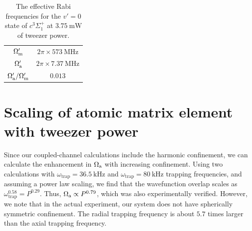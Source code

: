 \documentclass[aps,secnumarabic,amsmath,amssymb,10pt,superscriptaddress]{revtex4}
\newcommand{\todo}[1]{}
\begin{document}

\begin{table}[ht]
  \centering
  \begin{tabular}{|c|c|} \hline
    $\Omega_{\rm m}'$ &  $2\pi \times 573 ~\mathrm{MHz}$ \\
    $\Omega_{\rm a}'$ &  $2\pi \times 7.37 ~\mathrm{MHz}$ \\
    $\Omega_{\rm a}'/\Omega_{\rm m}'$ & $ 0.013 $ \\ \hline
  \end{tabular}
  \caption{ The effective Rabi frequencies for the $v' = 0$ state of $c^3\Sigma^+_1$ at $ 3.75~\mathrm{mW}$ of tweezer power.
    \label{tab:sm}}
\end{table}


\section{Scaling of atomic matrix element with tweezer power}

Since our coupled-channel calculations include the harmonic confinement, we can calculate the enhancement in $\Omega_{\rm a}$ with increasing confinement. Using two calculations with $ \omega_{\text{trap}} = 36.5~\mathrm{kHz}$ and $\omega_{\text{trap}} = 80~\mathrm{kHz}$ trapping frequencies, and assuming a power law scaling, we find that the wavefunction overlap scales as $ \omega_{\text{trap}}^{0.58} = P^{0.29} $. Thus, $\Omega_{\rm a} \propto P^{0.79} $, which was also experimentally verified. However, we note that in the actual experiment, our system does not have spherically symmetric confinement. The radial trapping frequency is about $5.7$ times larger than the axial trapping frequency.
\todo{
  Power/intensity calibration
}


\end{document}
